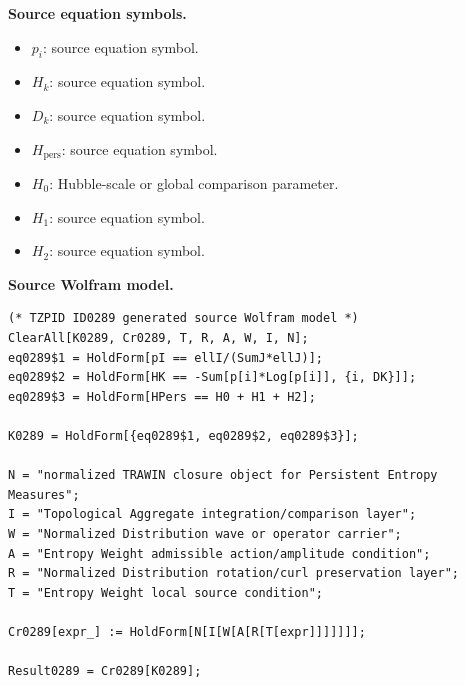 \begin{minipage}[t]{0.49\linewidth}
\begingroup
\small
\raggedright
\textbf{Source equation symbols.}\par
\begin{itemize}[leftmargin=1.35em,itemsep=1pt,topsep=1pt,parsep=0pt]
    \item $p_i$: source equation symbol.
    \item $H_k$: source equation symbol.
    \item $D_k$: source equation symbol.
    \item $H_{\mathrm{pers}}$: source equation symbol.
    \item $H_0$: Hubble-scale or global comparison parameter.
    \item $H_1$: source equation symbol.
    \item $H_2$: source equation symbol.
\end{itemize}
\endgroup
\end{minipage}\hfill
\begin{minipage}[t]{0.47\linewidth}
\begingroup
\scriptsize
\raggedright
\textbf{Source Wolfram model.}\par
\begin{Verbatim}[fontsize=\tiny,breaklines=true,breakanywhere=true]
(* TZPID ID0289 generated source Wolfram model *)
ClearAll[K0289, Cr0289, T, R, A, W, I, N];
eq0289$1 = HoldForm[pI == ellI/(SumJ*ellJ)];
eq0289$2 = HoldForm[HK == -Sum[p[i]*Log[p[i]], {i, DK}]];
eq0289$3 = HoldForm[HPers == H0 + H1 + H2];

K0289 = HoldForm[{eq0289$1, eq0289$2, eq0289$3}];

N = "normalized TRAWIN closure object for Persistent Entropy Measures";
I = "Topological Aggregate integration/comparison layer";
W = "Normalized Distribution wave or operator carrier";
A = "Entropy Weight admissible action/amplitude condition";
R = "Normalized Distribution rotation/curl preservation layer";
T = "Entropy Weight local source condition";

Cr0289[expr_] := HoldForm[N[I[W[A[R[T[expr]]]]]]];

Result0289 = Cr0289[K0289];
\end{Verbatim}
\endgroup
\end{minipage}

